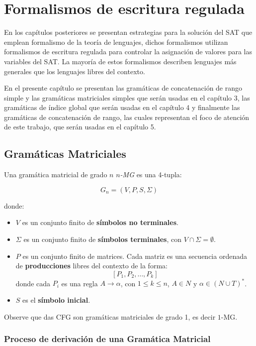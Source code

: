 \chapter{Formalismos de escritura regulada}

En los capítulos posteriores se presentan estrategias para la solución del SAT que emplean formalismo de la teoría de lenguajes,
dichos formalismos utilizan formalismos de escritura regulada para controlar la asignación de valores para las variables del SAT.
La mayoría de estos formalismos describen lenguajes más generales que los lenguajes libres del contexto.

En el presente capítulo se presentan las gramáticas de concatenación de rango simple y las gramáticas matriciales simples que serán usadas en el capítulo 3, las gramáticas
de índice global que serán usadas en el capítulo 4 y finalmente las gramáticas de concatenación de rango, las cuales
representan el foco de atención de este trabajo, que serán usadas en el capítulo 5.


\section{Gramáticas Matriciales}

Una gramática matricial \cite{simpleMatrixLanguages} de grado $n$ \textit{$n$-MG} es una 4-tupla:

\[
      G_n = (V, P, S,\Sigma)
\]

donde:
\begin{itemize}
      \item \( V \) es un conjunto finito de \textbf{símbolos no terminales}.
      \item \( \Sigma \) es un conjunto finito de \textbf{símbolos terminales}, con \( V \cap \Sigma = \emptyset \).
      \item \( P \) es un conjunto finito de matrices. Cada matriz es una secuencia ordenada de \textbf{producciones} libres del contexto de la forma:
            \[
                  [P_1, P_2, \dots, P_k]
            \]
            donde cada \( P_i \) es una regla \( A \to \alpha \), con $1\leq k\leq n$, \( A \in N \) y \( \alpha \in (N \cup T)^* \).
      \item \( S  \) es el \textbf{símbolo inicial}.
\end{itemize}

Observe que das CFG son gramáticas matriciales de grado 1, es decir $1$-MG.

\subsection{Proceso de derivación de una Gramática Matricial}

